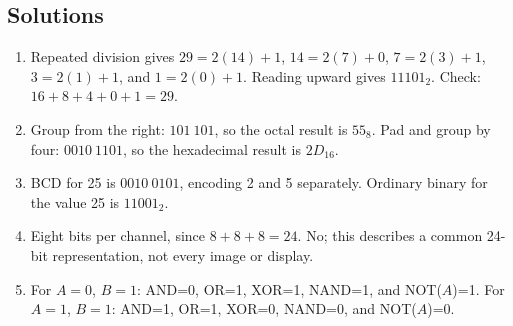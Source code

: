 \documentclass[11pt]{article}
\begin{document}
\subsection*{Solutions}
\begingroup\small
\begin{enumerate}[label=\arabic*.]
  \item Repeated division gives $29=2(14)+1$, $14=2(7)+0$,
    $7=2(3)+1$, $3=2(1)+1$, and $1=2(0)+1$. Reading upward gives
    $11101_2$. Check: $16+8+4+0+1=29$.
  \item Group from the right: $101\ 101$, so the octal result is $55_8$.
    Pad and group by four: $0010\ 1101$, so the hexadecimal result is
    $2D_{16}$.
  \item BCD for 25 is $0010\ 0101$, encoding 2 and 5 separately.
    Ordinary binary for the value 25 is $11001_2$.
  \item Eight bits per channel, since $8+8+8=24$. No; this describes a
    common 24-bit representation, not every image or display.
  \item For $A=0$, $B=1$: AND=0, OR=1, XOR=1, NAND=1, and NOT($A$)=1.
    For $A=1$, $B=1$: AND=1, OR=1, XOR=0, NAND=0, and NOT($A$)=0.
\end{enumerate}
\endgroup
\end{document}
